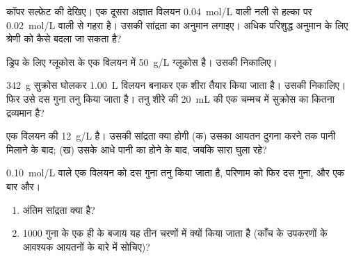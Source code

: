 \begin{exercise}[$\star\star$]\label{exo:g10:concentration-and-dilution:8}
कॉपर सल्फ़ेट की  देखिए। एक दूसरा अज्ञात विलयन
\qty{0.04}{mol/L} वाली नली से हल्का पर \qty{0.02}{mol/L} वाली से गहरा है। उसकी
सांद्रता का अनुमान लगाइए। अधिक परिशुद्ध अनुमान के लिए श्रेणी को कैसे बदला जा
सकता है?
\end{exercise}

\begin{exercise}[$\star\star$]\label{exo:g10:concentration-and-dilution:9}
ड्रिप के लिए ग्लूकोस के एक विलयन में \qty{50}{g/L} ग्लूकोस
 है। उसकी  निकालिए।
\end{exercise}

\begin{exercise}[$\star\star$]\label{exo:g10:concentration-and-dilution:10}
\qty{342}{g} सुक्रोस  घोलकर \qty{1.00}{L} विलयन बनाकर एक
शीरा तैयार किया जाता है। उसकी  निकालिए। फिर उसे दस गुना तनु किया
जाता है। तनु शीरे की \qty{20}{mL} की एक चम्मच में सुक्रोस का कितना द्रव्यमान
है?
\end{exercise}

\begin{exercise}[$\star\star$]\label{exo:g10:concentration-and-dilution:11}
एक विलयन की  \qty{12}{g/L} है। उसकी सांद्रता क्या होगी
(क) उसका आयतन दुगना करने तक पानी मिलाने के बाद; (ख) उसके आधे पानी
का  होने के बाद, जबकि सारा 
घुला रहे?
\end{exercise}

\begin{exercise}[$\star\star\star$]\label{exo:g10:concentration-and-dilution:12}
\qty{0.10}{mol/L} वाले एक विलयन को दस गुना तनु किया जाता है, परिणाम को फिर दस
गुना, और एक बार और।
\begin{enumerate}
  \item अंतिम सांद्रता क्या है?
  \item 1000 गुना के एक ही  के बजाय यह तीन चरणों में क्यों किया जाता है
        (काँच के उपकरणों के आवश्यक आयतनों के बारे में सोचिए)?
\end{enumerate}
\end{exercise}

